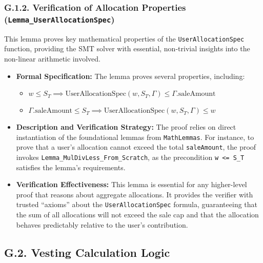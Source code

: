 \documentclass[
  english,
  onecolumn]{article}
\providecommand{\tightlist}{%
  \setlength{\itemsep}{0pt}\setlength{\parskip}{0pt}}
\begin{document}
\subsubsection{\texorpdfstring{G.1.2. Verification of Allocation
Properties
(\texttt{Lemma\_UserAllocationSpec})}{G.1.2. Verification of Allocation Properties (Lemma\_UserAllocationSpec)}}\label{g.1.2.-verification-of-allocation-properties-lemma_userallocationspec}

This lemma proves key mathematical properties of the
\texttt{UserAllocationSpec} function, providing the SMT solver with
essential, non-trivial insights into the non-linear arithmetic involved.

\begin{itemize}
\tightlist
\item
  \textbf{Formal Specification:} The lemma proves several properties,
  including:

  \begin{itemize}
  \tightlist
  \item
    \(w \le S_T \implies \text{UserAllocationSpec}(w, S_T, \Gamma) \le \Gamma.\text{saleAmount}\)
  \item
    \(\Gamma.\text{saleAmount} \le S_T \implies \text{UserAllocationSpec}(w, S_T, \Gamma) \le w\)
  \end{itemize}
\item
  \textbf{Description and Verification Strategy:} The proof relies on
  direct instantiation of the foundational lemmas from
  \texttt{MathLemmas}. For instance, to prove that a user's allocation
  cannot exceed the total \texttt{saleAmount}, the proof invokes
  \texttt{Lemma\_MulDivLess\_From\_Scratch}, as the precondition
  \texttt{w\ \textless{}=\ S\_T} satisfies the lemma's requirements.
\item
  \textbf{Verification Effectiveness:} This lemma is essential for any
  higher-level proof that reasons about aggregate allocations. It
  provides the verifier with trusted ``axioms'' about the
  \texttt{UserAllocationSpec} formula, guaranteeing that the sum of all
  allocations will not exceed the sale cap and that the allocation
  behaves predictably relative to the user's contribution.
\end{itemize}

\subsection{G.2. Vesting Calculation
Logic}\label{g.2.-vesting-calculation-logic}
\end{document}
